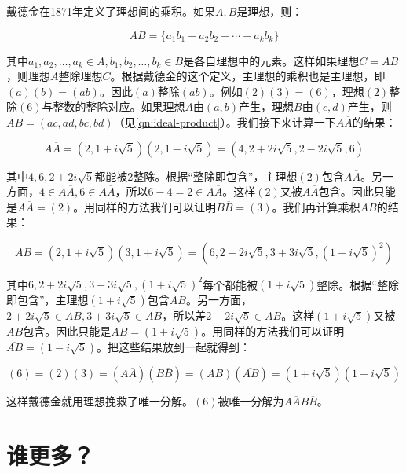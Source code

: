 \documentclass[b5paper]{ctexart}
\begin{document}
戴德金在1871年定义了理想间的乘积。如果$A, B$是理想，则：

\[
AB = \{a_1b_1 + a_2b_2 + \dotsb + a_kb_k\}
\]

其中$a_1, a_2, \dotsc, a_k \in A, b_1, b_2, \dotsc, b_k \in B$是各自理想中的元素。这样如果理想$C = AB$，则理想$A$整除理想$C$。根据戴德金的这个定义，主理想的乘积也是主理想，即$(a)(b) = (ab)$。因此$(a)$整除$(ab)$。例如$(2)(3) = (6)$，理想$(2)$整除$(6)$与整数的整除对应。如果理想$A$由$(a, b)$产生，理想$B$由$(c, d)$产生，则$AB = (ac, ad, bc, bd)$（见\ref{qn:ideal-product}）。我们接下来计算一下$A\overline{A}$的结果：

\[
A\overline{A} = (2, 1 + i\sqrt{5})(2, 1 - i\sqrt{5}) = (4, 2 + 2i\sqrt{5}, 2 - 2i\sqrt{5}, 6)
\]

其中$4, 6, 2 \pm 2i\sqrt{5}$都能被2整除。根据“整除即包含”，主理想$(2)$包含$A\overline{A}$。另一方面，$4 \in A\overline{A}, 6 \in A\overline{A}$，所以$6 - 4 = 2 \in A\overline{A}$。这样$(2)$又被$A\overline{A}$包含。因此只能是$A\overline{A} = (2)$。用同样的方法我们可以证明$B\overline{B} = (3)$。我们再计算乘积$AB$的结果：

\[
AB = (2, 1 + i\sqrt{5})(3, 1 + i\sqrt{5}) = (6, 2 + 2i\sqrt{5}, 3 + 3i\sqrt{5}, (1 + i\sqrt{5})^2)
\]

其中$6, 2 + 2i\sqrt{5}, 3 + 3i\sqrt{5}, (1 + i\sqrt{5})^2$每个都能被$(1 + i\sqrt{5})$整除。根据“整除即包含”，主理想$(1 + i\sqrt{5})$包含$AB$。另一方面，$2 + 2i\sqrt{5} \in AB, 3 + 3i\sqrt{5} \in AB$，所以差$2 + 2i\sqrt{5} \in AB$。这样$(1 + i\sqrt{5})$又被$AB$包含。因此只能是$AB = (1 + i\sqrt{5})$。用同样的方法我们可以证明$\overline{AB} = (1 - i\sqrt{5})$。把这些结果放到一起就得到：

\[
(6) = (2)(3) = (A\overline{A})(B\overline{B}) = (AB)(\overline{AB}) = (1 + i\sqrt{5})(1 - i\sqrt{5})
\]

这样戴德金就用理想挽救了唯一分解。$(6)$被唯一分解为$A\overline{A}B\overline{B}$。

\section{谁更多？}

\end{document}
